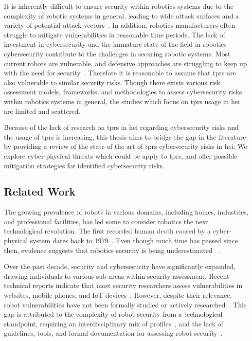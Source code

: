 It is inherently difficult to ensure security within robotics systems due to the complexity of robotic systems in general, leading to
wide
attack surfaces
and a variety
of potential attack vectors~\cite[2]{robot_security_review_2022}. In addition, robotics manufacturers often struggle to mitigate
vulnerabilities in reasonable time periods. The lack of investment in cybersecurity and the
immature state of the field in robotics cybersecurity contribute
to the challenges in securing robotic systems.
Most current robots are vulnerable, and defensive approaches are struggling
to keep up with the need for security~\cite[12]{robot_security_review_2022}. Therefore it is reasonable to assume that \ac{tprs} are also
vulnerable to similar security risks. Though there exists various risk assessment models, frameworks, and methodologies to assess
cybersecurity risks within robotics systems in general, the studies which focus on \ac{tprs} usage in \ac{hei} are limited and scattered.

Because of the lack of research on \ac{tprs} in \ac{hei} regarding cybersecurity risks and the usage of \ac{tprs}
is increasing, this thesis aims to bridge the gap in the literature by providing a review of the state of the art of
\ac{tprs} cybersecurity risks in \ac{hei}. We explore cyber-physical threats which could be apply to \ac{tprs}, and offer possible
mitigation strategies for identified cybersecurity risks.

\subsection{Related Work}
The growing prevalence of robots in various domains, including homes, industries, and professional facilities, has led some to
consider robotics the next technological revolution. The first recorded human death caused by a cyber-physical system
dates back to 1979~\cite[2]{robot_security_review_2022}. Even though much time has passed since then, evidence suggests that robotics security is being underestimated
~\cite[1-2]{
  robot_security_framework_2018}.

Over the past decade, security and cybersecurity have significantly expanded, drawing individuals to various sub-areas within security
assessment. Recent technical reports indicate that most security researchers assess vulnerabilities in
websites, mobile phones, and \ac{IoT} devices~\cite[]{dbir_2022, robot_security_review_2022}.
However, despite their relevance, robot vulnerabilities have not been formally studied or actively researched~\cite[1]{robot_security_review_2022}. This gap is attributed to the complexity of robot security from a
technological standpoint, requiring an interdisciplinary mix of profiles~\cite[74-77]{introduction_to_robot_system_security_2021}, and the lack of guidelines, tools, and formal documentation
for assessing robot security~\cite[7]{cyber_security_issues_in_robotics_2021}.

